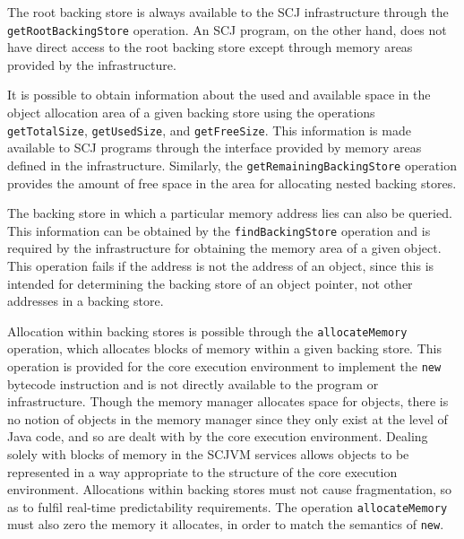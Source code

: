 
The root backing store is always available to the SCJ infrastructure
through the \texttt{get\-Root\-Backing\-Store} operation.
An SCJ program, on the other hand, does not have direct access to the
root backing store except through memory areas provided by the
infrastructure.

It is possible to obtain information about the used and available
space in the object allocation area of a given backing store using the
operations \texttt{get\-Total\-Size}, \texttt{get\-Used\-Size}, and
\texttt{get\-Free\-Size}.
This information is made available to SCJ programs through the
interface provided by memory areas defined in the infrastructure.
Similarly, the \texttt{getRemainingBackingStore} operation provides
the amount of free space in the area for allocating nested
backing stores.

The backing store in which a particular memory address lies can also
be queried.
This information can be obtained by the \texttt{find\-Backing\-Store}
operation and is required by the infrastructure for obtaining the
memory area of a given object.
This operation fails if the address is not the address of an object,
since this is intended for determining the backing store of an object
pointer, not other addresses in a backing store.

Allocation within backing stores is possible through the
\texttt{allocate\-Memory} operation, which allocates blocks of memory
within a given backing store.
This operation is provided for the core execution environment to
implement the \texttt{new} bytecode instruction and is not directly
available to the program or infrastructure.
Though the memory manager allocates space for objects, there is no
notion of objects in the memory manager since they only exist at the
level of Java code, and so are dealt with by the core execution
environment. 
Dealing solely with blocks of memory in the SCJVM services allows
objects to be represented in a way appropriate to the structure of the
core execution environment.
Allocations within backing stores must not cause fragmentation, so as
to fulfil real-time predictability requirements.
The operation \texttt{allocate\-Memory} must also zero the memory it
allocates, in order to match the semantics of \texttt{new}.
 
